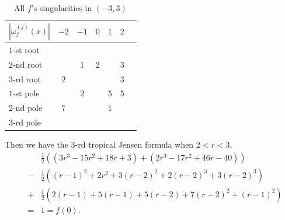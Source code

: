 \documentclass{article}
\begin{document}
\begin{table}[ht]
\caption{All $f$'s singularities in $(-3, 3)$}\label{tab2}
\begin{tabular*}{\textwidth}{@{\extracolsep\fill}lcccccc}
\toprule%
$|\omega_{f}^{(j)}(x)|$ & $-2$ & $-1$ & $0$ & $1$ & $2$ \\
\midrule
$1$-st root  &  &  &  &  &  \\
$2$-nd root  &  & $1$  & $2$  &  & $3$ \\
$3$-rd root  & $2$ &  &  &  & $3$ \\
$1$-st pole  & & $2$ &  & $5$ & $5$\\
$2$-nd pole  & $7$ &  & & $1$ & \\
$3$-rd pole  &  &  &  &  & \\
\toprule
\end{tabular*}
\end{table}
Then we have the $3$-rd tropical Jensen formula when $2< r< 3$,
    \begin{eqnarray*}
        &&\frac{1}{2}((3r^{3}-15r^{2}+18r+3)+(2r^{3}-17r^{2}+46r-40))\\
        &-&\frac{1}{2}((r-1)^{2}+2r^{2}+3(r-2)^{2}+2(r-2)^{3}+3(r-2)^{3})\\
        &+&\frac{1}{2}(2(r-1)+5(r-1)+5(r-2)+7(r-2)^{2}+(r-1)^{2})\\
        &=&1=f(0).
    \end{eqnarray*}
\end{document}
